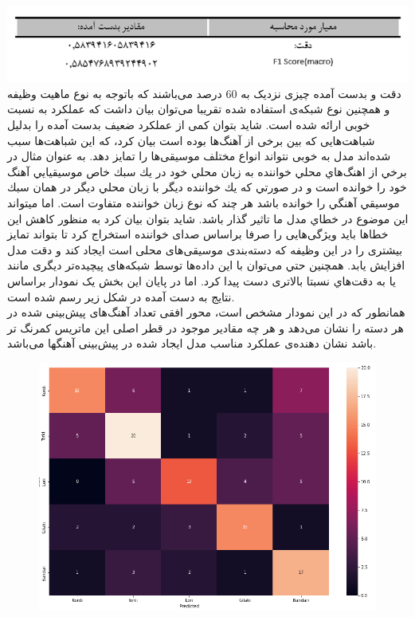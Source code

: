 \documentclass[10pt,onecolumn,a4paper]{article}
\begin{document}
\includegraphics[scale=0.45]{e.png}
\\
دقت و   بدست آمده چیزی نزدیک به 60 درصد می‌باشند که باتوجه به نوع ماهیت وظیفه و همچنین نوع شبکه‌ی استفاده شده تقریبا می‌توان بیان داشت که عملکرد به نسبت خوبی ارائه شده است. شاید بتوان کمی از عملکرد ضعیف بدست آمده را بدلیل شباهت‌هایی که بین برخی از آهنگ‌ها بوده است بیان کرد، که این شباهت‌ها سبب شده‌اند مدل به خوبی نتواند انواع مختلف موسیقی‌ها را تمایز دهد.  به عنوان مثال در برخي از اهنگ‌هاي محلي خواننده به زبان محلي خود در يك سبك خاص موسيقيايي آهنگ خود را خوانده است و در صورتي كه يك خواننده ديگر با زبان محلي ديگر در همان سبك موسيقي آهنگي را خوانده باشد هر چند كه نوع زبان خواننده متفاوت است. اما ميتواند اين موضوع در خطاي مدل ما تاثير گذار باشد. شايد بتوان بيان كرد به منظور کاهش این خطاها باید ویژگی‌هایی را صرفا براساس صدای خواننده استخراج کرد تا بتواند تمایز بیشتری را در این وظیفه که دسته‌بندی موسیقی‌های محلی است ایجاد کند و دقت مدل افزايش يابد. همچنين حتي می‌توان با این داده‌ها توسط شبکه‌های پیچیده‌تر دیگری مانند  یا  به دقت‌هاي نسبتا بالاتری دست پیدا کرد. 
اما در پایان این بخش یک نمودار   براساس نتایج به دست آمده در شکل زیر رسم شده است.\\ 
همانطور که در این نمودار مشخص است، محور افقی تعداد آهنگ‌های پیش‌بینی شده در هر دسته را نشان می‌دهد و هر چه مقادیر موجود در قطر اصلی این ماتریس کمرنگ تر باشد نشان دهنده‌ی عملکرد مناسب مدل ایجاد شده در پیش‌بینی آهنگها  می‌باشد. \\

\begin{figure}[h!]
        \centering
        \includegraphics[scale=0.5]{f.png}
        \caption{  }  
    \end{figure}
\end{document}
